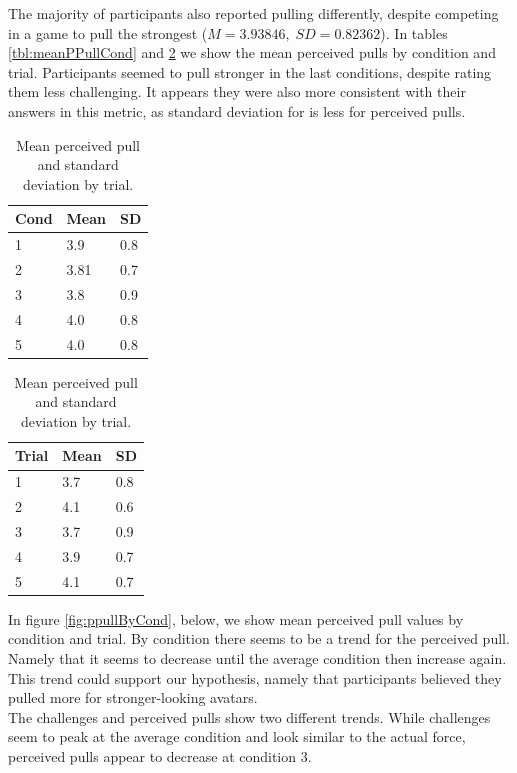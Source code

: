 
The majority of participants also reported pulling differently, despite competing in a game to pull the strongest ($ M=3.93846,\; SD=0.82362 $). In tables \ref{tbl:meanPPullCond} and \ref{tbl:meanPPullTrial} we show the mean perceived pulls by condition and trial. Participants seemed to pull stronger in the last conditions, despite rating them less challenging. It appears they were also more consistent with their answers in this metric, as standard deviation for is less for perceived pulls.

\begin{table}[H]
 \captionsetup{justification=centering,margin=0.1cm}
 \begin{minipage}{.5\linewidth}
     \centering
\begin{tabular}{|lll|}
\hline
Cond & Mean & SD \\
\hline
1 &  3.9 & 0.8\\  
2 &  3.81 & 0.7\\ 
3 &  3.8 & 0.9\\ 
4 &  4.0 & 0.8\\  
5 & 4.0 & 0.8\\  
\hline
\end{tabular}
\caption{Mean perceived pull and standard deviation by condition.}
\label{tbl:meanPPullCond}
\end{minipage}\hfill
 \begin{minipage}{.5\linewidth}
 \centering
\begin{tabular}{|lll|}
\hline
Trial & Mean & SD \\
\hline
1 & 3.7 & 0.8\\  
2 & 4.1 & 0.6\\  
3 & 3.7 &  0.9\\  
4 & 3.9 & 0.7\\  
5 & 4.1 &  0.7\\  
\hline
\end{tabular}
\caption{Mean perceived pull and standard deviation by trial.}
\label{tbl:meanPPullTrial}
\end{minipage}
\end{table} 

In figure \ref{fig:ppullByCond}, below, we show mean perceived pull values by condition and trial. By condition there seems to be a trend for the perceived pull. Namely that it seems to decrease until the average condition then increase again. This trend could support our hypothesis, namely that participants believed they pulled more for stronger-looking avatars. 
\\
The challenges and perceived pulls show two different trends. While challenges seem to peak at the average condition and look similar to the actual force, perceived pulls appear to decrease at condition 3.

